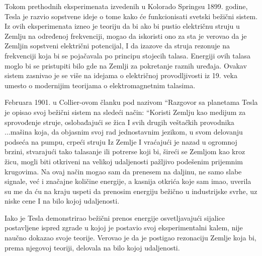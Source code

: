 \documentclass[a4paper]{article}
\begin{document}
Tokom prethodnih eksperimenata izvedenih u Kolorado Springsu 1899. godine, Tesla je razvio sopstvene ideje o tome kako će funkcionisati svetski bežični sistem. Iz ovih eksperimenata izneo je teoriju da bi ako bi pustio električnu struju u Zemlju na određenoj frekvenciji, mogao da iskoristi ono za sta je verovao da je Zemljin sopstveni električni potencijal, I da izazove da struja rezonuje na frekvenciji koja bi se pojačavala po principu stojecih talasa\cite{stojeciTalasi}. Energiji ovih talasa moglo bi se pristupiti bilo gde na Zemlji za pokretanje raznih uređaja. Ovakav sistem zasnivao je se više na idejama o električnoj provodljivosti iz 19. veka umesto o modernijim teorijama o elektromagnetnim talasima.
	
Februara 1901. u Collier-ovom članku pod nazivom “Razgovor sa planetama Tesla je opisao svoj bežični sistem na sledeći način:
“Koristi Zemlju kao medijum za sprovođenje struje, oslobađajući se žica I svih drugih veštačkih provodnika ...mašina koja, da objasnim svoj rad jednostavnim jezikom, u svom delovanju podseća na pumpu, crpeći struju Iz Zemlje I vraćajući je nazad u ogromnoj brzini, stvarajući tako talasanje ili potrerse koji bi, šireći se Zemljom kao kroz žicu, mogli biti otkriveni na velikoj udaljenosti pažljivo podešenim prijemnim krugovima. Na ovaj način mogao sam da prenesem na daljinu, ne samo slabe signale, već i značajne količine energije, a kasnija otkrića koje sam imao, uverila su me da ću na kraju uspeti da prenosim energiju bežično u industrijske svrhe, uz niske cene I na bilo kojoj udaljenosti.

Iako je Tesla demonstrirao bežični prenos energije osvetljavajući sijalice postavljene ispred zgrade u kojoj je postavio svoj eksperimentalni kalem,\cite{teslinClanak} nije naučno dokazao svoje teorije. Verovao je da je postigao rezonaciju Zemlje koja bi, prema njegovoj teoriji, delovala na bilo kojoj udaljenosti.\cite{teorija}



\end{document}
